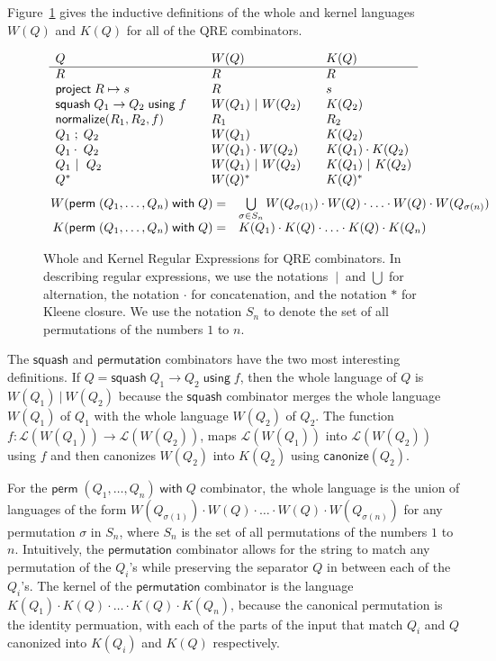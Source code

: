 \documentclass[acmsmall,review,anonymous]{acmart}
\newcommand{\codefont}[1]{\ensuremath{\mathsf{#1}}}
\newcommand{\kw}[1]{\codefont{#1}}
\newcommand{\project}[2]{\ensuremath{\kw{project} \; #1 \mapsto #2}}
\newcommand{\squash}[3]{\ensuremath{\kw{squash} \; #1 \rightarrow #2\; \kw{using} \; #3}}
\newcommand{\perm}[2]{\ensuremath{\kw{perm}\; (#1)\; \kw{with}\; #2}}
\newcommand{\normalize}[3]{\ensuremath{\kw{normalize}(#1, #2, #3)}}
\newcommand{\sep}{\ensuremath{\ | \ }}
\newcommand{\canonize}{\ensuremath{\kw{canonize}}}
\begin{document}
Figure~\ref{fig:wk} gives the inductive definitions of the whole and
kernel languages $W(Q)$ and $K(Q)$ for all of the QRE combinators.
\begin{figure}[t]
\centering
\[
\begin{array}{l@{\quad\quad}l@{\quad\quad}l}

Q & W(Q) & K(Q) \\ \hline
R & R & R \\
\project{R}{s} & R & s \\
\squash{Q_1}{Q_2}{f} & W(Q_1) \sep W(Q_2) & K(Q_2) \\
\normalize{R_1}{R_2}{f} & R_1 & R_2 \\
Q_1 \; ; \; Q_2 & W(Q_1) & K(Q_2) \\
Q_1 \cdot\; Q_2 & W(Q_1) \cdot W(Q_2) & K(Q_1) \cdot K(Q_2) \\
Q_1 \sep \; Q_2 & W(Q_1) \sep W(Q_2) & K(Q_1) \sep K(Q_2) \\
Q^* & W(Q)^* & K(Q)^* \\
\end{array}
\]
\[
\begin{array}{r@{\quad}l}
W( \perm{Q_1, \ldots, Q_n}{Q} ) = &
\bigcup \limits_{\sigma \in S_n} W(Q_{\sigma(1)}) \cdot W(Q) \cdot \ldots \cdot
W(Q) \cdot W(Q_{\sigma(n)})\\
K( \perm{Q_1, \ldots, Q_n}{Q} ) = & K(Q_1) \cdot K(Q) \cdot \ldots \cdot K(Q)
\cdot K(Q_n)
\end{array}
\]
\caption{Whole and Kernel Regular Expressions for QRE combinators. 
In describing regular expressions, we use the notations $\sep$ and $\bigcup$ for
alternation, the notation $\cdot$ for concatenation, and the notation
$*$ for Kleene closure.  
We use the notation $S_n$ to denote the set of all permutations of the
numbers $1$ to $n$.
}
\label{fig:wk}
\end{figure}
The \kw{squash} and \kw{permutation} combinators have the two most
interesting definitions. If $Q = \squash{Q_1}{Q_2}{f}$, then the whole language
of $Q$ is $W(Q_1) \sep W(Q_2)$ because the \kw{squash} combinator
merges the whole language $W(Q_1)$ of $Q_1$ with the whole language $W(Q_2)$ of $Q_2$.
The function $f : \mathcal{L}(W(Q_1)) \longrightarrow \mathcal{L}(W(Q_2))$,
maps $\mathcal{L}(W(Q_1))$ into $\mathcal{L}(W(Q_2))$ using $f$ and then
canonizes $W(Q_2)$ into $K(Q_2)$ using $\canonize(Q_2)$.

For the $\perm{Q_1, \ldots, Q_n}{Q}$ combinator, the whole language is the
union of languages of the form $W(Q_{\sigma(1)}) \cdot W(Q) \cdot \ldots \cdot
W(Q) \cdot W(Q_{\sigma(n)})$ for any permutation $\sigma$ in $S_n$, where
$S_n$ is the set of all permutations of the numbers $1$ to $n$. Intuitively,
the \kw{permutation} combinator allows for the string to match any
permutation of the $Q_i$'s while preserving the separator $Q$ in
between each of the $Q_i$'s. The kernel of the \kw{permutation} combinator
is the language $K(Q_1) \cdot K(Q) \cdot \ldots \cdot K(Q) \cdot K(Q_n)$,
because the canonical permutation is the identity permuation, with each of the
parts of the input that match $Q_i$ and $Q$ canonized into $K(Q_i)$ and $K(Q)$
respectively.
\end{document}
